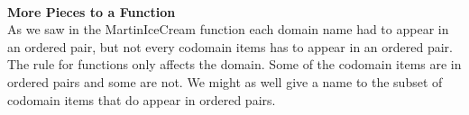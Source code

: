 \documentclass{ximera}
\begin{document}
\quad \\

\textbf{More Pieces to a Function} \\

As we saw in the MartinIceCream function each domain name had to appear in an ordered pair, but not every codomain items has to appear in an ordered pair. The rule for functions only affects the domain. Some of the codomain items are in ordered pairs and some are not. We might as well give a name to the subset of codomain items that do appear in ordered pairs.
\end{document}
